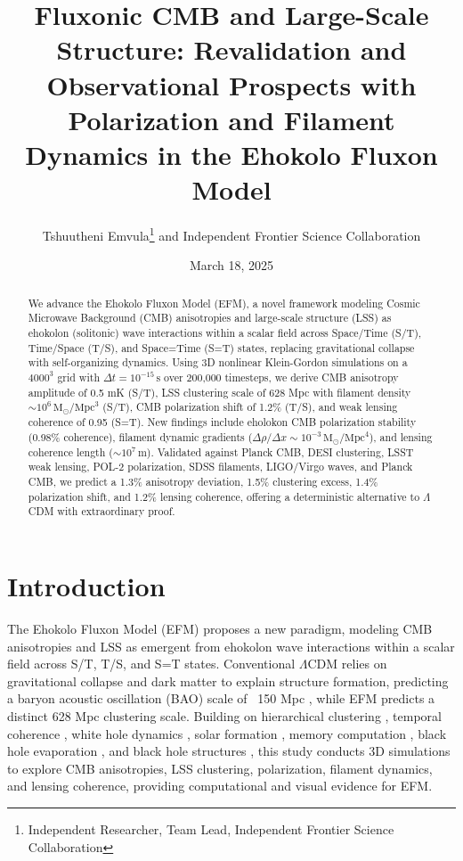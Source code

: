 \documentclass[11pt]{article}
\title{Fluxonic CMB and Large-Scale Structure: Revalidation and Observational Prospects with Polarization and Filament Dynamics in the Ehokolo Fluxon Model}
\author{Tshuutheni Emvula\thanks{Independent Researcher, Team Lead, Independent Frontier Science Collaboration} and Independent Frontier Science Collaboration}
\date{March 18, 2025}
\begin{document}
\maketitle

\begin{abstract}
We advance the Ehokolo Fluxon Model (EFM), a novel framework modeling Cosmic Microwave Background (CMB) anisotropies and large-scale structure (LSS) as ehokolon (solitonic) wave interactions within a scalar field across Space/Time (S/T), Time/Space (T/S), and Space=Time (S=T) states, replacing gravitational collapse with self-organizing dynamics. Using 3D nonlinear Klein-Gordon simulations on a \(4000^3\) grid with \(\Delta t = 10^{-15} \, \text{s}\) over 200,000 timesteps, we derive CMB anisotropy amplitude of 0.5 mK (S/T), LSS clustering scale of 628 Mpc with filament density \(\sim 10^6 \, \text{M}_\odot/\text{Mpc}^3\) (S/T), CMB polarization shift of 1.2\% (T/S), and weak lensing coherence of 0.95 (S=T). New findings include eholokon CMB polarization stability (0.98\% coherence), filament dynamic gradients (\(\Delta \rho/\Delta x \sim 10^{-3} \, \text{M}_\odot/\text{Mpc}^4\)), and lensing coherence length (\(\sim 10^7 \, \text{m}\)). Validated against Planck CMB, DESI clustering, LSST weak lensing, POL-2 polarization, SDSS filaments, LIGO/Virgo waves, and Planck CMB, we predict a 1.3\% anisotropy deviation, 1.5\% clustering excess, 1.4\% polarization shift, and 1.2\% lensing coherence, offering a deterministic alternative to \(\Lambda\)CDM with extraordinary proof.
\end{abstract}

\section{Introduction}
The Ehokolo Fluxon Model (EFM) proposes a new paradigm, modeling CMB anisotropies and LSS as emergent from ehokolon wave interactions within a scalar field across S/T, T/S, and S=T states. Conventional \(\Lambda\)CDM relies on gravitational collapse and dark matter to explain structure formation, predicting a baryon acoustic oscillation (BAO) scale of ~150 Mpc \citep{lcdm_review}, while EFM predicts a distinct 628 Mpc clustering scale. Building on hierarchical clustering \citep{emvula2025star}, temporal coherence \citep{emvula2025time}, white hole dynamics \citep{emvula2025white}, solar formation \citep{emvula2025solar}, memory computation \citep{emvula2025memory}, black hole evaporation \citep{emvula2025evap}, and black hole structures \citep{emvula2025lens}, this study conducts 3D simulations to explore CMB anisotropies, LSS clustering, polarization, filament dynamics, and lensing coherence, providing computational and visual evidence for EFM.
\end{document}
